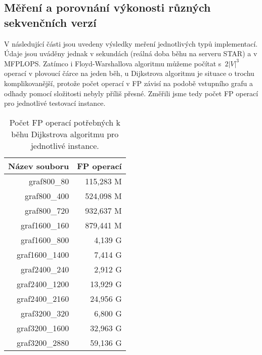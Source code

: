 \documentclass[a4paper,11pt]{article}
\begin{document}
\subsection{Měření a porovnání výkonosti různých sekvenčních verzí}
V následující části jsou uvedeny výsledky meření jednotlivých typů implementací. Údaje jsou uváděny jednak v sekundách (reálná doba běhu na serveru STAR) a v MFPLOPS. Zatímco i Floyd-Warshallova algoritmu můžeme počítat s~$2|V|^3$ operací v plovoucí čárce na jeden běh, u Dijkstrova algoritmu je situace o trochu komplikovanější, protože počet operací v FP závisí na podobě vstupního grafu a odhady pomocí složitosti nebyly příliš přesné. Změřili jsme tedy počet FP operací pro jednotlivé testovací instance.
\begin{table}[H]
  \begin{center}
      \begin{tabular}{|r|r|}
      \hline
      Název souboru 	& FP operací  	\\ \hline
      graf800\_80  	& 115,283 M            		\\ \hline
      graf800\_400     	& 524,098 M    		     	\\ \hline
      graf800\_720  	& 932,637 M    	            	\\ \hline
      graf1600\_160    	& 879,441 M    	        	\\ \hline
      graf1600\_800  	& 4,139 G    	           	\\ \hline
      graf1600\_1400   	& 7,414 G    	         	\\ \hline
      graf2400\_240  	& 2,912 G    	          	\\ \hline
      graf2400\_1200   	& 13,929 G    	         	\\ \hline
      graf2400\_2160  	& 24,956 G    	            	\\ \hline
      graf3200\_320    	& 6,800 G             		\\ \hline
      graf3200\_1600  	& 32,963 G    	            	\\ \hline
      graf3200\_2880   	& 59,136 G    	         	\\ \hline
      \end{tabular}
  \caption{Počet FP operací potřebných k běhu Dijkstrova algoritmu pro jednotlivé instance.}
  \label{tab:fp_operace}
  \end{center}
\end{table}
\end{document}
